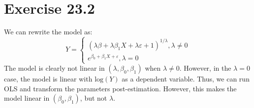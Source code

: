 \documentclass{article}
\newcommand{\loge}[1]{\text{log}\left(#1\right)}
\newcommand{\eps}{\varepsilon}
\begin{document}

\section*{Exercise 23.2}

We can rewrite the model as:
\[
	Y = 	\begin{cases}
				\left(\lambda\beta + \lambda\beta_1 X + \lambda\eps  + 1\right)^{1/\lambda},	\lambda\neq 0	\\
				e^{\beta_0 + \beta_1X + \eps},												 	\lambda = 0
			\end{cases}
\]
The model is clearly not linear in $(\lambda,\beta_0,\beta_1)$ when $\lambda\neq0$. However, in the ${\lambda=0}$ case, the model is linear with $\loge{Y}$ as a dependent variable. Thus, we can run OLS and transform the parameters post-estimation. However, this makes the model linear in $(\beta_0,\beta_1)$, but not $\lambda$.

\end{document}

